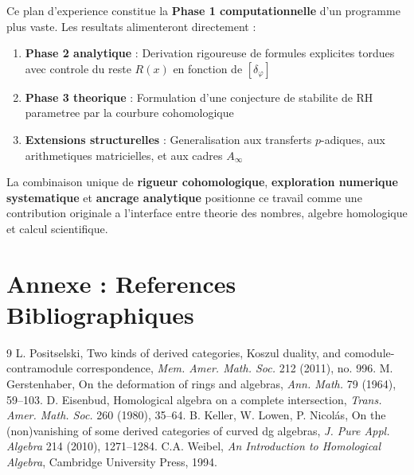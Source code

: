 \documentclass[11pt,a4paper]{article}
\begin{document}
	Ce plan d'experience constitue la \textbf{Phase 1 computationnelle} d'un programme plus vaste. Les resultats alimenteront directement :
	\begin{enumerate}
		\item \textbf{Phase 2 analytique} : Derivation rigoureuse de formules explicites tordues avec controle du reste $R(x)$ en fonction de $[\delta_\varphi]$
		\item \textbf{Phase 3 theorique} : Formulation d'une conjecture de stabilite de RH parametree par la courbure cohomologique
		\item \textbf{Extensions structurelles} : Generalisation aux transferts $p$-adiques, aux arithmetiques matricielles, et aux cadres $A_\infty$
	\end{enumerate}
	
	La combinaison unique de \textbf{rigueur cohomologique}, \textbf{exploration numerique systematique} et \textbf{ancrage analytique} positionne ce travail comme une contribution originale a l'interface entre theorie des nombres, algebre homologique et calcul scientifique.
	
	\section*{Annexe : References Bibliographiques}
	\begin{thebibliography}{9}
		 L. Positselski, Two kinds of derived categories, Koszul duality, and comodule-contramodule correspondence, \emph{Mem. Amer. Math. Soc.} 212 (2011), no. 996.
		 M. Gerstenhaber, On the deformation of rings and algebras, \emph{Ann. Math.} 79 (1964), 59--103.
		 D. Eisenbud, Homological algebra on a complete intersection, \emph{Trans. Amer. Math. Soc.} 260 (1980), 35--64.
		 B. Keller, W. Lowen, P. Nicolás, On the (non)vanishing of some derived categories of curved dg algebras, \emph{J. Pure Appl. Algebra} 214 (2010), 1271--1284.
		 C.A. Weibel, \emph{An Introduction to Homological Algebra}, Cambridge University Press, 1994.
	\end{thebibliography}
	
\end{document}
